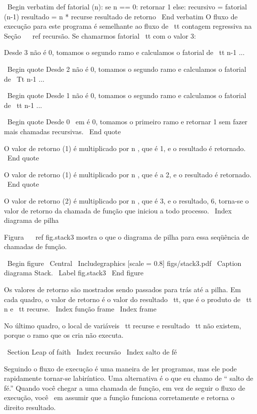 \documentclass[10pt]{book}
\begin{document}
\begin {itemize}
{{{{\ Begin {verbatim}
def fatorial (n):
    se n == 0:
        retornar 1
    else:
        recursivo = fatorial (n-1)
        resultado = n * recurse
        resultado de retorno
\ End {verbatim}
%
O fluxo de execução para este programa é semelhante ao fluxo de {\ tt
contagem regressiva} na Seção ~ \ ref {recursão}. Se chamarmos fatorial {\ tt}
com o valor 3:

Desde 3 não é 0, tomamos o segundo ramo e calculamos o fatorial
de {\ tt n-1} ...

\ Begin {quote}
Desde 2 não é 0, tomamos o segundo ramo e calculamos o fatorial de
{\ Tt n-1} ...


  \ Begin {quote}
  Desde 1 não é 0, tomamos o segundo ramo e calculamos o fatorial
  de {\ tt n-1} ...


    \ Begin {quote}
    Desde 0 {\ em} é 0, tomamos o primeiro ramo e retornar 1
    sem fazer mais chamadas recursivas.
    \ End {quote}


  O valor de retorno (1) é multiplicado por n $ $, que é 1, e o
  resultado é retornado.
  \ End {quote}


O valor de retorno (1) é multiplicado por n $ $, que é a 2, e o
resultado é retornado.
\ End {quote}


O valor de retorno (2) é multiplicado por n $ $, que é 3, e o resultado, 6,
torna-se o valor de retorno da chamada de função que iniciou a todo
processo.
\ Index {diagrama de pilha}

Figura ~ \ ref {} fig.stack3 mostra o que o diagrama de pilha para
essa seqüência de chamadas de função.

\ Begin {figure}
\ Central
{\ Includegraphics [scale = 0.8] {figs/stack3.pdf}}
\ Caption {diagrama Stack.}
\ Label {} fig.stack3
\ End {figure}

Os valores de retorno são mostrados sendo passados ​​para trás até a pilha. Em cada
quadro, o valor de retorno é o valor do resultado {\ tt}, que é o
produto de {\ tt n} e {\ tt recurse}.
\ Index {função frame}
\ Index {frame}

No último quadro, o local de
variáveis ​​{\ tt recurse} e {resultado \ tt} não existem, porque
o ramo que os cria não executa.


\ Section {Leap of faith}
\ Index {recursão}
\ Index {salto de fé}

Seguindo o fluxo de execução é uma maneira de ler programas, mas
ele pode rapidamente tornar-se labiríntico. Uma
alternativa é o que eu chamo de `` salto de fé.'' Quando você chegar a uma
chamada de função, em vez de seguir o fluxo de execução, você {\ em
assumir} que a função funciona corretamente e retorna o direito
resultado.

}}}}
\end{itemize}
\end{document}
